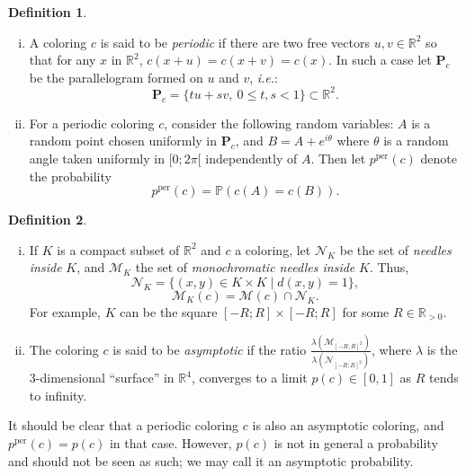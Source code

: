 \documentclass[a4paper,11pt]{article}
\theoremstyle{definition}
\newtheorem{definition}{Definition}
\theoremstyle{remark}
\newcommand{\R}{\mathbb{R}}
\newcommand{\M}{\mathcal{M}}
\newcommand{\N}{\mathcal{N}}
\renewcommand{\Pr}{\mathbb{P}}
\renewcommand{\P}{\mathbf{P}}
\newcommand{\pper}{p^{\mathrm{per}}}
\begin{document}
\begin{definition}
\
\begin{enumerate}[i)] \label{pper}
\item A coloring $c$ is said to be \textit{periodic} if there are two free
vectors $u,v\in \R^2$ so that for any $x$ in $\R ^2$, $c(x+u)=c(x+v)=c(x)$. In such a
case let $\P_c$ be the parallelogram formed on $u$ and $v$, \textit{i.e.}:
\[\P_c = \{tu+sv, \ 0\leq t,s< 1 \} \subset \R ^2. \]
\item For a periodic coloring $c$, consider the following random variables:
$A$ is a random point chosen uniformly in $\P_c$, and $B=A + e^{i \theta}$ where
$\theta$ is a random angle taken uniformly in $[0;2 \pi[$ independently of $A$.
Then let $\pper(c)$ denote the probability
$$\pper(c) = \Pr(c(A)=c(B)).$$
\end{enumerate}
\end{definition}

\begin{definition}
\
\begin{enumerate}[i)]\label{defas}
\item If $K$ is a compact subset of $\R^2$ and $c$ a coloring, let $\N_K$ be
the set of \textit{needles inside} $K$, and $\M_K$ the set of \textit{monochromatic
needles inside} $K$. Thus,
\[\N_K = \{(x,y) \in K \times K \mid d(x,y)=1\}, \]
\[\M_K (c) = \M (c) \cap \N_K. \]
For example, $K$ can be the square $[-R;R]\times [-R;R]$ for some $R\in \R_{>0}$.

\item  \label{asympt}The coloring $c$ is said to be \textit{asymptotic} if the ratio
$\frac{\lambda (\M_{[-R;R]^2})}{\lambda (\N_{[-R;R]^2})}$, where $\lambda$ is the
3-dimensional ``surface'' in $\R^4$,
converges to a limit $p(c) \in [0,1]$ as $R$ tends to infinity.
\end{enumerate}
\end{definition}

It should be clear that a periodic coloring $c$ is also an asymptotic coloring,
and $\pper(c)=p(c)$ in that case. However, $p(c)$ is not
in general a probability and should not be seen as such; we may call it an 
asymptotic probability.
\smallskip
\end{document}
